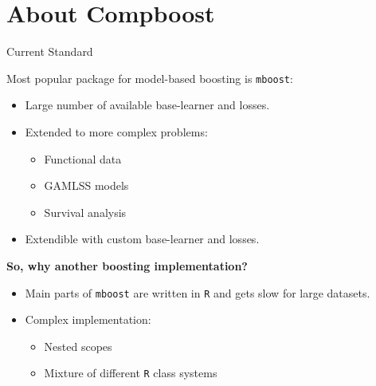 \documentclass[10pt]{beamer}\usepackage[]{graphicx}\usepackage[]{color}
\begin{document}
\section{About Compboost}

\begin{frame}{Current Standard}

Most popular package for model-based boosting is \texttt{mboost}:

\begin{itemize}

  \item
    Large number of available base-learner and losses.

  \item
    Extended to more complex problems:
    \begin{itemize}
      \item Functional data
      \item GAMLSS models
      \item Survival analysis
    \end{itemize}
  \item
    Extendible with custom base-learner and losses.

\end{itemize}

\textbf{So, why another boosting implementation?}

\begin{itemize}

  \item
    Main parts of \texttt{mboost} are written in \texttt{R} and gets slow for large datasets.

  \item
    Complex implementation:
    \begin{itemize}
      \item Nested scopes
      \item Mixture of different \texttt{R} class systems
    \end{itemize}
\end{itemize}

\end{frame}
\end{document}
